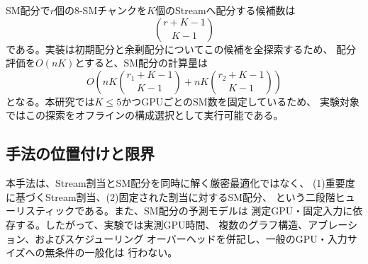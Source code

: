 SM配分で$r$個の8-SMチャンクを$K$個のStreamへ配分する候補数は
\[
 {r+K-1\choose K-1}
\]
である。実装は初期配分と余剰配分についてこの候補を全探索するため、
配分評価を$O(nK)$とすると、SM配分の計算量は
\[
 O\left(nK{r_1+K-1\choose K-1}
       +nK{r_2+K-1\choose K-1}\right)
\]
となる。本研究では$K\leq5$かつGPUごとのSM数を固定しているため、
実験対象ではこの探索をオフラインの構成選択として実行可能である。

\subsection{手法の位置付けと限界}
本手法は、Stream割当とSM配分を同時に解く厳密最適化ではなく、
(1)重要度に基づくStream割当、(2)固定された割当に対するSM配分、
という二段階ヒューリスティックである。また、SM配分の予測モデルは
測定GPU・固定入力に依存する。したがって、実験では実測GPU時間、
複数のグラフ構造、アブレーション、およびスケジューリング
オーバーヘッドを併記し、一般のGPU・入力サイズへの無条件の一般化は
行わない。
